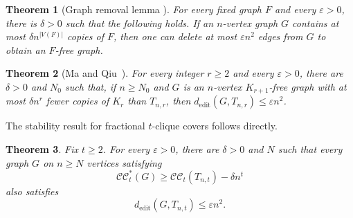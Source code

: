 \documentclass[11pt]{article}
\numberwithin{equation}{section}
\newtheorem{theorem}{Theorem}[section]
\theoremstyle{remark}
\newcommand{\e}{\varepsilon}
\newcommand{\CC}{\mathcal{CC}}
\newcommand{\CCstar}{\mathcal{CC}^{*}}
\newcommand{\ed}{d_{\mathrm{edit}}}
\begin{document}
\begin{theorem}[Graph removal lemma \cite{Removal}]\label{cov:thm:graph-removal}
For every fixed graph $F$ and every $\varepsilon>0$, there is $\delta>0$
such that the following holds.  If an $n$-vertex graph $G$
contains at most $\delta n^{|V(F)|}$ copies of $F$, then one can delete at most
$\varepsilon n^2$ edges from $G$ to obtain an $F$-free graph.
\end{theorem}

\begin{theorem}[Ma and Qiu~\cite{MaQiu}]\label{cov:thm:maqiu}
  For every integer \(r\ge2\) and every \(\e>0\), there are \(\delta>0\) and \(N_0\) such that,
  if \(n\ge N_0\) and \(G\) is an \(n\)-vertex \(K_{r+1}\)-free graph with at most \(\delta n^r\)
  fewer copies of \(K_r\) than \(T_{n,r}\), then \(\ed(G,T_{n,r})\le \e n^2\).
\end{theorem}

The stability result for fractional \(t\)-clique covers follows directly.

\begin{theorem}
  \label{cov:prop:fractional-stability}
Fix \(t\ge2\). For every \(\varepsilon>0\), there are \(\delta>0\) and \(N\) such that
every graph \(G\) on \(n\ge N\) vertices satisfying
\begin{equation*}
\CCstar_t(G)\ge \CC_t(T_{n,t})-\delta n^t
\end{equation*}
also satisfies
\begin{equation*}
\ed(G,T_{n,t})\le \varepsilon n^2.
\end{equation*}
\end{theorem}
\end{document}
